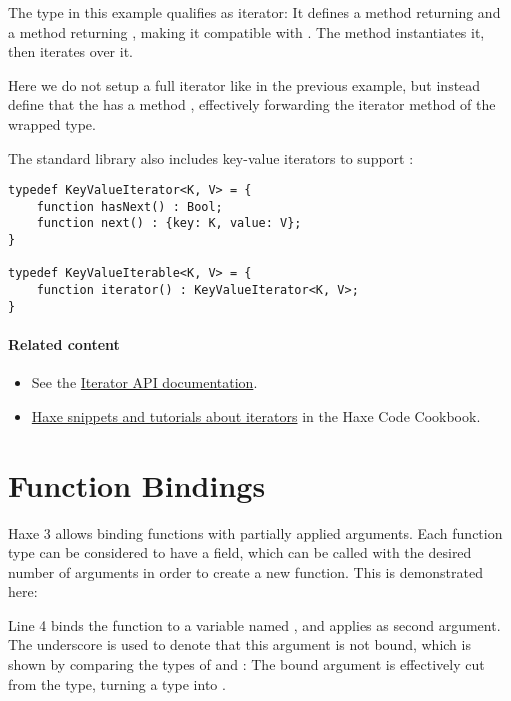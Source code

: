 
The type  in this example qualifies as iterator: It defines a method  returning  and a method  returning , making it compatible with . The  method instantiates it, then iterates over it.


Here we do not setup a full iterator like in the previous example, but instead define that the  has a method , effectively forwarding the iterator method of the wrapped  type.


The standard library also includes key-value iterators to support :

\begin{lstlisting}
typedef KeyValueIterator<K, V> = {
	function hasNext() : Bool;
	function next() : {key: K, value: V};
}

typedef KeyValueIterable<K, V> = {
	function iterator() : KeyValueIterator<K, V>;
}
\end{lstlisting}

\paragraph{Related content}
\begin{itemize}
	\item See the \href{http://api.haxe.org/Iterator.html}{Iterator API documentation}.
	\item \href{http://code.haxe.org/tag/iterator.html}{Haxe snippets and tutorials about iterators} in the Haxe Code Cookbook.
\end{itemize}


\section{Function Bindings}
\label{lf-function-bindings}

Haxe 3 allows binding functions with partially applied arguments. Each function type can be considered to have a  field, which can be called with the desired number of arguments in order to create a new function. This is demonstrated here:

Line 4 binds the function  to a variable named , and applies  as second argument. The underscore \expr{_} is used to denote that this argument is not bound, which is shown by comparing the types of  and : The bound  argument is effectively cut from the type, turning a  type into .

